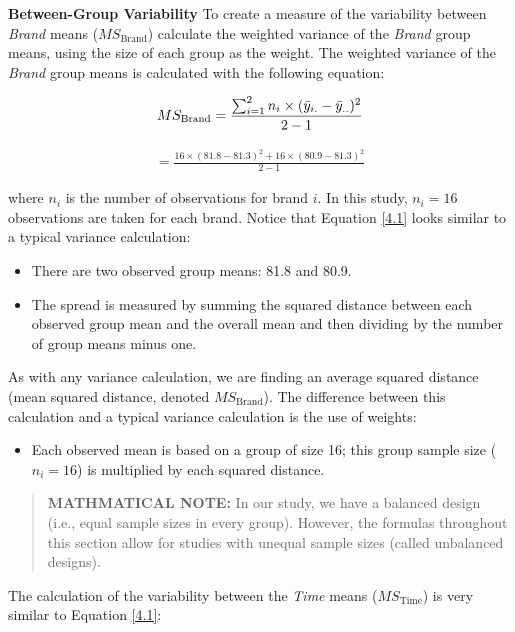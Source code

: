 \documentclass[
]{book}
\providecommand{\tightlist}{%
  \setlength{\itemsep}{0pt}\setlength{\parskip}{0pt}}
\begin{document}
\textbf{Between-Group Variability} To create a measure of the variability between \emph{Brand} means (\(MS_{\text{Brand}}\)) calculate the weighted variance of the \emph{Brand} group means, using the size of each group as the weight. The weighted variance of the \emph{Brand} group means is calculated with the following equation:

\begin{align}
MS_{\text{Brand}} = \frac{\sum_{i=1}^{2} n_i \times (\bar{y}_{i.} - \bar{y}_{..})^2}{2-1}
\notag
\end{align}

\begin{align}\label{4.1}
= \frac{16 \times (81.8 - 81.3)^2 + 16 \times (80.9 - 81.3)^2}{2-1}
\tag{4.1}
\end{align}

where \(n_i\) is the number of observations for brand \(i\). In this study, \(n_i = 16\) observations are taken for each brand. Notice that Equation \ref{4.1} looks similar to a typical variance calculation:

\begin{itemize}
\tightlist
\item
  There are two observed group means: 81.8 and 80.9.
\item
  The spread is measured by summing the squared distance between each observed group mean and the overall mean and then dividing by the number of group means minus one.
\end{itemize}

As with any variance calculation, we are finding an average squared distance (mean squared distance, denoted \(MS_{\text{Brand}}\)). The difference between this calculation and a typical variance calculation is the use of weights:

\begin{itemize}
\tightlist
\item
  Each observed mean is based on a group of size 16; this group sample size (\(n_i = 16\)) is multiplied by each squared distance.
\end{itemize}

\begin{quote}
\textbf{MATHMATICAL NOTE:} In our study, we have a balanced design (i.e., equal sample sizes in every group). However, the formulas throughout this section allow for studies with unequal sample sizes (called unbalanced designs).
\end{quote}

The calculation of the variability between the \emph{Time} means (\(MS_{\text{Time}}\)) is very similar to Equation \ref{4.1}:
\end{document}
